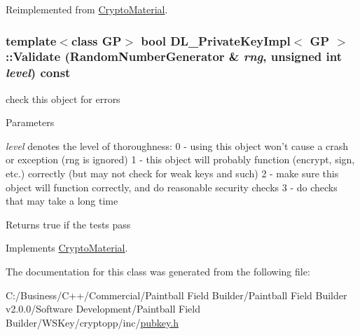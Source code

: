 Reimplemented from \hyperlink{class_crypto_material_a64ab4ff4adfcfc2da59706ac32895b50}{CryptoMaterial}.\hypertarget{class_d_l___private_key_impl_aa4ad7f55ea46d222c5e7e37f67bd20fe}{
\subsubsection[{Validate}]{\setlength{\rightskip}{0pt plus 5cm}template$<$class GP$>$ bool {\bf DL\_\-PrivateKeyImpl}$<$ GP $>$::Validate ({\bf RandomNumberGenerator} \& {\em rng}, \/  unsigned int {\em level}) const}}
\label{class_d_l___private_key_impl_aa4ad7f55ea46d222c5e7e37f67bd20fe}


check this object for errors 
\begin{DoxyParams}{Parameters}
\item[{\em level}]denotes the level of thoroughness: 0 -\/ using this object won't cause a crash or exception (rng is ignored) 1 -\/ this object will probably function (encrypt, sign, etc.) correctly (but may not check for weak keys and such) 2 -\/ make sure this object will function correctly, and do reasonable security checks 3 -\/ do checks that may take a long time \end{DoxyParams}
\begin{DoxyReturn}{Returns}
true if the tests pass 
\end{DoxyReturn}


Implements \hyperlink{class_crypto_material_aaa7d67d0c12712de0e33713c73f5b718}{CryptoMaterial}.

The documentation for this class was generated from the following file:\begin{DoxyCompactItemize}
\item 
C:/Business/C++/Commercial/Paintball Field Builder/Paintball Field Builder v2.0.0/Software Development/Paintball Field Builder/WSKey/cryptopp/inc/\hyperlink{pubkey_8h}{pubkey.h}\end{DoxyCompactItemize}
